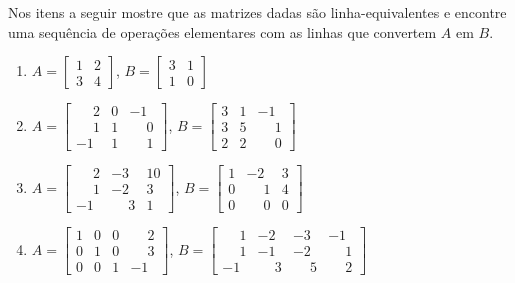 \documentclass[12pt]{exam}
\begin{document}
\begin{exercicio}
  Nos itens a seguir mostre que as matrizes dadas são linha-equivalentes e encontre uma sequência de operações elementares com as
  linhas que convertem $A$ em $B$.
  \begin{enumerate}[label={\alph*})]
    \item $A = \begin{bmatrix}1 & 2\\3 & 4\end{bmatrix}$, $B = \begin{bmatrix}3 & 1\\1 & 0\end{bmatrix}$

    \item $A = \begin{bmatrix}\phantom{-} 2 & 0 & -1\\\phantom{-} 1 & 1 & \phantom{-} 0\\-1 & 1 & \phantom{-} 1\end{bmatrix}$,
      $B = \begin{bmatrix}3 & 1 & -1\\3 & 5 & \phantom{-} 1\\2 & 2 & \phantom{-} 0\end{bmatrix}$

      \item $A = \begin{bmatrix}\phantom{-} 2 & -3 & 10\\\phantom{-} 1 & -2 & 3\\-1 & \phantom{-} 3 & 1\end{bmatrix}$, $B = \begin{bmatrix}1 & -2 & 3\\0 & \phantom{-} 1 & 4\\0 & \phantom{-} 0 & 0\end{bmatrix}$

      \item $A = \begin{bmatrix}1 & 0 & 0 & \phantom{-} 2\\0 & 1 & 0 & \phantom{-} 3\\0 & 0 & 1 & -1\end{bmatrix}$, $B = \begin{bmatrix}\phantom{-} 1 & -2 & -3 & -1\\\phantom{-} 1 & -1 & -2 & \phantom{-} 1\\-1 & \phantom{-} 3 & \phantom{-} 5 & \phantom{-} 2\end{bmatrix}$
  \end{enumerate}
\end{exercicio}
\end{document}
